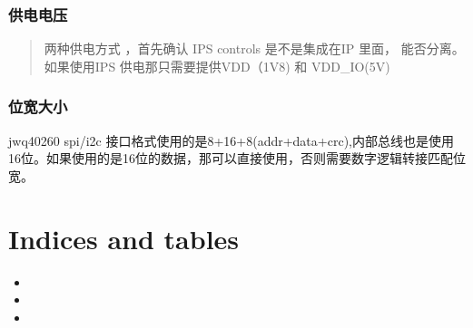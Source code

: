 \documentclass[letterpaper,10pt,english]{sphinxmanual}
\begin{document}
\subsection{供电电压}
\label{\detokenize{otp:id2}}\begin{quote}

\sphinxAtStartPar
两种供电方式 ，首先确认 IPS controls 是不是集成在IP 里面， 能否分离。如果使用IPS 供电那只需要提供VDD（1V8) 和 VDD\_IO(5V)
\end{quote}

\noindent{}


\subsection{位宽大小}
\label{\detokenize{otp:id3}}
\sphinxAtStartPar
jwq40260 spi/i2c 接口格式使用的是8+16+8(addr+data+crc),内部总线也是使用16位。如果使用的是16位的数据，那可以直接使用，否则需要数字逻辑转接匹配位宽。

\noindent{}


\chapter{Indices and tables}
\label{\detokenize{index:indices-and-tables}}\begin{itemize}
\item {} 
\sphinxAtStartPar
{}

\item {} 
\sphinxAtStartPar
{}

\item {} 
\sphinxAtStartPar
{}

\end{itemize}



\renewcommand{\indexname}{索引}
\printindex
\end{document}

